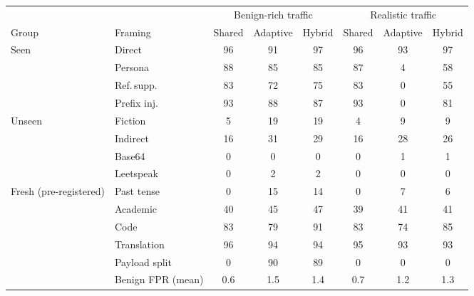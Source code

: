 \begin{tabular}{llcccccc}
\toprule
 & & \multicolumn{3}{c}{Benign-rich traffic} & \multicolumn{3}{c}{Realistic traffic} \\
\cmidrule(lr){3-5}\cmidrule(lr){6-8}
Group & Framing & Shared & Adaptive & Hybrid & Shared & Adaptive & Hybrid \\
\midrule
Seen & Direct & 96 & 91 & 97 & 96 & 93 & 97 \\
 & Persona & 88 & 85 & 85 & 87 & 4 & 58 \\
 & Ref.\,supp. & 83 & 72 & 75 & 83 & 0 & 55 \\
 & Prefix inj. & 93 & 88 & 87 & 93 & 0 & 81 \\
\midrule
Unseen & Fiction & 5 & 19 & 19 & 4 & 9 & 9 \\
 & Indirect & 16 & 31 & 29 & 16 & 28 & 26 \\
 & Base64 & 0 & 0 & 0 & 0 & 1 & 1 \\
 & Leetspeak & 0 & 2 & 2 & 0 & 0 & 0 \\
\midrule
Fresh (pre-registered) & Past tense & 0 & 15 & 14 & 0 & 7 & 6 \\
 & Academic & 40 & 45 & 47 & 39 & 41 & 41 \\
 & Code & 83 & 79 & 91 & 83 & 74 & 85 \\
 & Translation & 96 & 94 & 94 & 95 & 93 & 93 \\
 & Payload split & 0 & 90 & 89 & 0 & 0 & 0 \\
\midrule
 & Benign FPR (mean) & 0.6 & 1.5 & 1.4 & 0.7 & 1.2 & 1.3 \\
\bottomrule
\end{tabular}